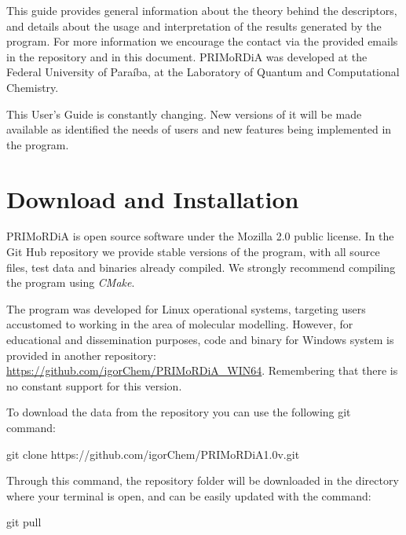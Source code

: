 \documentclass[a4paper,11pt]{refart}
\begin{document}
	This guide provides general information about the theory behind the descriptors, and details about the usage and interpretation of the results generated by the program. For more information we encourage the contact via the provided emails in the repository and in this document. PRIMoRDiA was developed at the Federal University of Paraíba, at the Laboratory of Quantum and Computational Chemistry.

	This User's Guide is constantly changing. New versions of it will be made available as identified the needs of users and new features being implemented in the program.

	\section{Download and Installation}

	PRIMoRDiA is open source software under the Mozilla 2.0 public license. In the Git Hub repository we provide stable versions of the program, with all source files, test data and binaries already compiled. We strongly recommend compiling the program using \emph{CMake}.

	The program was developed for Linux operational systems, targeting users accustomed to working in the area of molecular modelling. However, for educational and dissemination purposes, code and binary for Windows system is provided in another repository: \url{https://github.com/igorChem/PRIMoRDiA_WIN64}. Remembering that there is no constant support for this version.


	To download the data from the repository you can use the following git command:

	\hspace*{-\leftmarginwidth}
	\begin{minipage}{\fullwidth}
		\begin{commandshell}git clone https://github.com/igorChem/PRIMoRDiA1.0v.git\end{commandshell}
	\end{minipage}

	Through this command, the repository folder will be downloaded in the directory where your terminal is open, and can be easily updated with the command:

	\hspace*{-\leftmarginwidth}
	\begin{minipage}{\fullwidth}
		\begin{commandshell}git pull\end{commandshell}
	\end{minipage}
\end{document}
